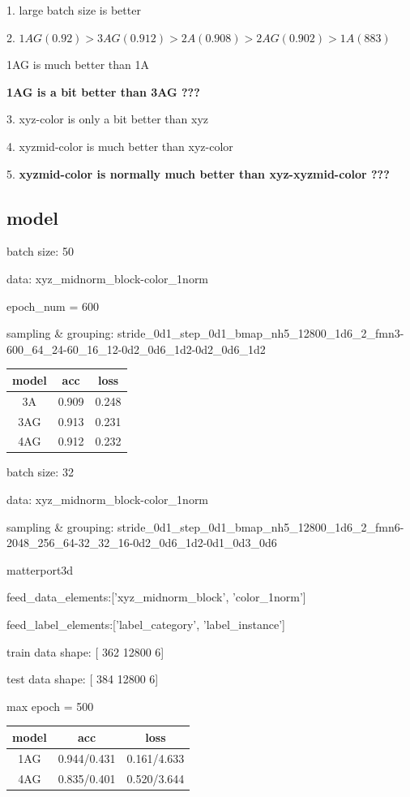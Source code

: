 \documentclass[,table,dvipsnames]{article}
\begin{document}
1. large batch size is better \par
2. $1AG (0.92) > 3AG(0.912) > 2A(0.908) > 2AG(0.902) > 1A(883)$ \par
   1AG is much better than 1A \par 
   \textbf{1AG is a bit better than 3AG ???} \par

3. xyz-color is only a bit better than xyz \par
4. xyzmid-color is much better than xyz-color \par
5. \textbf{xyzmid-color is normally much better than xyz-xyzmid-color ???} \par



\subsection{model}
batch size: 50 \par
data: xyz\_midnorm\_block-color\_1norm \par
epoch\_num = 600 \par
sampling \& grouping: stride\_0d1\_step\_0d1\_bmap\_nh5\_12800\_1d6\_2\_fmn3-600\_64\_24-60\_16\_12-0d2\_0d6\_1d2-0d2\_0d6\_1d2 \par
\begin{center}
	\begin{tabular}{|c | c c |} 
		\hline
		model  & acc & loss \\
		\hline
		3A & 0.909 & 0.248 \\ [0.5ex] 
		\hline
		3AG & 0.913 & 0.231 \\ [0.5ex] 
		\hline
		4AG & 0.912 & 0.232 \\ [0.5ex] 
		\hline	
	\end{tabular}
\end{center}

batch size: 32 \par
data: xyz\_midnorm\_block-color\_1norm \par
sampling \& grouping: stride\_0d1\_step\_0d1\_bmap\_nh5\_12800\_1d6\_2\_fmn6-2048\_256\_64-32\_32\_16-0d2\_0d6\_1d2-0d1\_0d3\_0d6 \par
matterport3d  \par
feed\_data\_elements:['xyz\_midnorm\_block', 'color\_1norm']  \par
feed\_label\_elements:['label\_category', 'label\_instance']  \par
train data shape: [  362 12800     6]  \par  
test data shape: [  384 12800     6] \par
max epoch = 500
\begin{center}
	\begin{tabular}{|c | c c |} 
		\hline
		model  & acc & loss \\
		\hline
		1AG & 0.944/0.431 & 0.161/4.633 \\ [0.5ex] 
		\hline
		
		4AG & 0.835/0.401 & 0.520/3.644 \\ [0.5ex] 
		\hline	
	\end{tabular}
\end{center}
\end{document}
